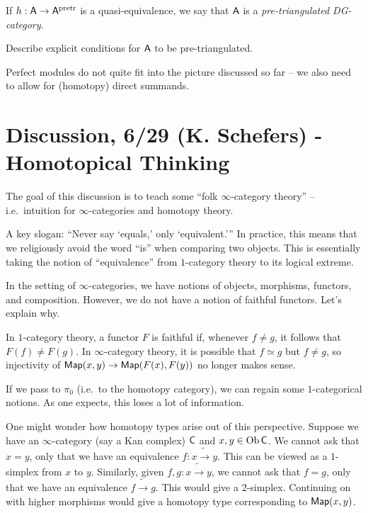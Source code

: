 \documentclass{amsart}
\begin{document}
\begin{dfn}
If $h: \mathsf{A} \to \mathsf{A}^{\mathrm{pretr}}$ is a quasi-equivalence, we say that $\mathsf{A}$ is a \emph{pre-triangulated DG-category}.
\end{dfn}

\begin{exer}
	Describe explicit conditions for $\mathsf{A}$ to be pre-triangulated.
\end{exer}

\begin{rmk}
	Perfect modules do not quite fit into the picture discussed so far -- we also need to allow for (homotopy) direct summands.
\end{rmk}

\section*{Discussion, 6/29 (K. Schefers) - Homotopical Thinking}

The goal of this discussion is to teach some ``folk $\infty$-category theory'' -- i.e.\ intuition for $\infty$-categories and homotopy theory.

A key slogan: ``Never say `equals,' only `equivalent.'''
In practice, this means that we religiously avoid the word ``is'' when comparing two objects.
This is essentially taking the notion of ``equivalence'' from $1$-category theory to its logical extreme.

\begin{ex}
In the setting of $\infty$-categories, we have notions of objects, morphisms, functors, and composition.
However, we do not have a notion of faithful functors.
Let's explain why.

In $1$-category theory, a functor $F$ is faithful if, whenever $f \neq g$, it follows that $F(f) \neq F(g)$.
In $\infty$-category theory, it is possible that $f \simeq g$ but $f \neq g$, so injectivity of $\mathsf{Map}(x, y) \to \mathsf{Map}(F(x), F(y))$ no longer makes sense.
\end{ex}

If we pass to $\pi_0$ (i.e.\ to the homotopy category), we can regain some $1$-categorical notions.
As one expects, this loses a lot of information.

One might wonder how homotopy types arise out of this perspective.
Suppose we have an $\infty$-category (say a Kan complex) $\mathsf{C}$ and $x, y \in \operatorname{Ob} \mathsf{C}$.
We cannot ask that $x = y$, only that we have an equivalence $f: x \tilde{\rightarrow} y$.
This can be viewed as a $1$-simplex from $x$ to $y$.
Similarly, given $f, g: x \tilde{\rightarrow} y$, we cannot ask that $f = g$, only that we have an equivalence $f \tilde{\rightarrow} g$.
This would give a $2$-simplex.
Continuing on with higher morphisms would give a homotopy type corresponding to $\mathsf{Map}(x, y)$.
\end{document}

